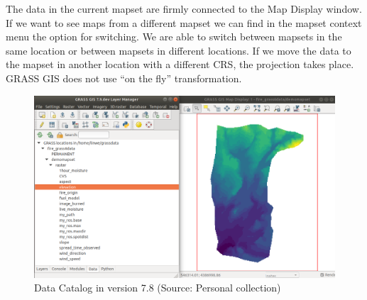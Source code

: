 \documentclass[a4paper,10pt,twoside]{article}
\begin{document}
%
The data in the current mapset are firmly connected to the Map Display
window. If we want to see maps from a different mapset we can find in
the mapset context menu the option for switching. We are able to
switch between mapsets in the same location or between mapsets in
different locations. If we move the data to the mapset in another
location with a different CRS, the projection takes place. GRASS GIS
does not use ``on the fly'' transformation.

\vspace{0.3cm}
\begin{figure}[hbt!] 
\begin{center}
\includegraphics[width=17cm]{../pictures/data_catalog_pred.png} 
\caption[Data Catalog in version 7.8]{Data Catalog in version 7.8 (Source: Personal collection)}
\label{fig:data_catalog_pred}
\end{center}
\end{figure}

\newpage
\vspace*{-1cm}
\end{document}
